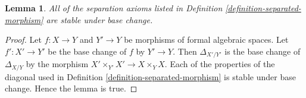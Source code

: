 \documentclass{stacks-project}
\theoremstyle{plain}
\newtheorem{lemma}[subsection]{Lemma}
\theoremstyle{definition}
\theoremstyle{remark}
\numberwithin{equation}{subsection}
\begin{document}
\begin{lemma}
\label{lemma-base-change-separated}
All of the separation axioms listed in
Definition \ref{definition-separated-morphism}
are stable under base change.
\end{lemma}

\begin{proof}
Let $f : X \to Y$ and $Y' \to Y$ be morphisms of formal algebraic spaces.
Let $f' : X' \to Y'$ be the base change of $f$ by $Y' \to Y$. Then
$\Delta_{X'/Y'}$ is the base change of $\Delta_{X/Y}$ by
the morphism $X' \times_{Y'} X' \to X \times_Y X$. Each of the properties
of the diagonal used in Definition \ref{definition-separated-morphism}
is stable under base change. Hence the lemma is true.
\end{proof}
\end{document}
